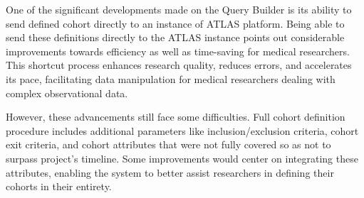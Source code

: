 One of the significant developments made on the Query Builder is its ability to send defined cohort directly to an instance of ATLAS platform. Being able to send these definitions directly to the ATLAS instance points out considerable improvements towards efficiency as well as time-saving for medical researchers. This shortcut process enhances research quality, reduces errors, and accelerates its pace, facilitating data manipulation for medical researchers dealing with complex observational data.

However, these advancements still face some difficulties. Full cohort definition procedure includes additional parameters like inclusion/exclusion criteria, cohort exit criteria, and cohort attributes that were not fully covered so as not to surpass project's timeline. Some improvements would center on integrating these attributes, enabling the system to better assist researchers in defining their cohorts in their entirety.
